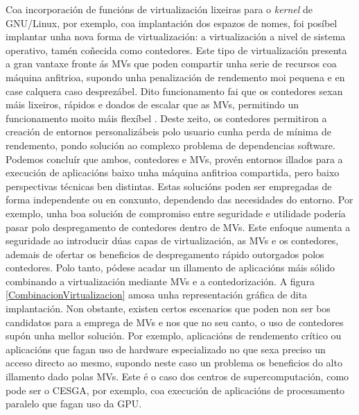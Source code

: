 Coa incorporación de funcións de virtualización lixeiras para o \textit{kernel} de GNU/Linux, por exemplo, coa implantación dos espazos de nomes, foi posíbel implantar unha nova forma de virtualización: a virtualización a nivel de sistema operativo, tamén coñecida como contedores. Este tipo de virtualización presenta a gran vantaxe fronte ás \gls{MV}s que poden compartir unha serie de recursos coa máquina anfitrioa, supondo unha penalización de rendemento moi pequena e en case calquera caso desprezábel. Dito funcionamento fai que os contedores sexan máis lixeiros, rápidos e doados de escalar que as \gls{MV}s, permitindo un funcionamento moito máis flexíbel \cite{introduccionContainerSecurityDocker}. Deste xeito, os contedores permitiron a creación de entornos personalizábeis polo usuario cunha perda de mínima de rendemento, pondo solución ao complexo problema de dependencias software.\\

Podemos concluír que ambos, contedores e \gls{MV}s, provén entornos illados para a execución de aplicacións baixo unha máquina anfitrioa compartida, pero baixo perspectivas técnicas ben distintas. Estas solucións poden ser empregadas de forma independente ou en conxunto, dependendo das necesidades do entorno. Por exemplo, unha boa solución de compromiso entre seguridade e utilidade podería pasar polo despregamento de contedores dentro de \gls{MV}s. Este enfoque aumenta a seguridade ao introducir dúas capas de virtualización, as \gls{MV}s e os contedores, ademais de ofertar os beneficios de despregamento rápido outorgados polos contedores. Polo tanto, pódese acadar un illamento de aplicacións máis sólido combinando a virtualización mediante \gls{MV}s e a contedorización. A figura \ref{CombinacionVirtualizacion} amosa unha representación gráfica de dita implantación. Non obstante, existen certos escenarios que poden non ser bos candidatos para a emprega de \gls{MV}s e nos que no seu canto, o uso de contedores supón unha mellor solución. Por exemplo, aplicacións de rendemento crítico ou aplicacións que fagan uso de hardware especializado no que sexa preciso un acceso directo ao mesmo, supondo neste caso un problema os beneficios do alto illamento dado polas \gls{MV}s. Este é o caso dos centros de supercomputación, como pode ser o \gls{CESGA}, por exemplo, coa execución de aplicacións de procesamento paralelo que fagan uso da \gls{GPU}.

